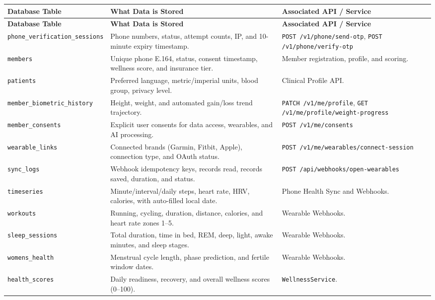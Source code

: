 \documentclass[11pt,a4paper]{article}
\begin{document}
\begin{longtable}{p{4cm} p{5.5cm} p{4.5cm}}
\toprule
\textbf{Database Table} & \textbf{What Data is Stored} & \textbf{Associated API / Service} \\
\midrule
\endfirsthead
\toprule
\textbf{Database Table} & \textbf{What Data is Stored} & \textbf{Associated API / Service} \\
\midrule
\endhead

\texttt{phone\_verification\_sessions} & Phone numbers, status, attempt counts, IP, and 10-minute expiry timestamp. & \texttt{POST /v1/phone/send-otp}, \texttt{POST /v1/phone/verify-otp} \\
\texttt{members} & Unique phone E.164, status, consent timestamp, wellness score, and insurance tier. & Member registration, profile, and scoring. \\
\texttt{patients} & Preferred language, metric/imperial units, blood group, privacy level. & Clinical Profile API. \\
\texttt{member\_biometric\_history} & Height, weight, and automated gain/loss trend trajectory. & \texttt{PATCH /v1/me/profile}, \texttt{GET /v1/me/profile/weight-progress} \\
\texttt{member\_consents} & Explicit user consents for data access, wearables, and AI processing. & \texttt{POST /v1/me/consents} \\
\texttt{wearable\_links} & Connected brands (Garmin, Fitbit, Apple), connection type, and OAuth status. & \texttt{POST /v1/me/wearables/connect-session} \\
\texttt{sync\_logs} & Webhook idempotency keys, records read, records saved, duration, and status. & \texttt{POST /api/webhooks/open-wearables} \\
\texttt{timeseries} & Minute/interval/daily steps, heart rate, HRV, calories, with auto-filled local date. & Phone Health Sync and Webhooks. \\
\texttt{workouts} & Running, cycling, duration, distance, calories, and heart rate zones 1--5. & Wearable Webhooks. \\
\texttt{sleep\_sessions} & Total duration, time in bed, REM, deep, light, awake minutes, and sleep stages. & Wearable Webhooks. \\
\texttt{womens\_health} & Menstrual cycle length, phase prediction, and fertile window dates. & Wearable Webhooks. \\
\texttt{health\_scores} & Daily readiness, recovery, and overall wellness scores (0--100). & \texttt{WellnessService}. \\

\end{longtable}
\end{document}

